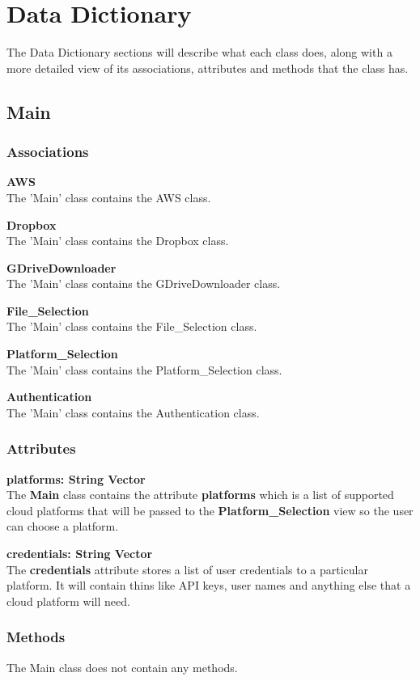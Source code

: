 \section{Data Dictionary}
The Data Dictionary sections will describe what each class does, along with a more detailed view of its
associations, attributes and methods that the class has.

\subsection{Main}

\subsubsection{Associations}
\textbf{AWS} \\
The 'Main' class contains the AWS class.

\textbf{Dropbox} \\
The 'Main' class contains the Dropbox class.

\textbf{GDriveDownloader} \\
The 'Main' class contains the GDriveDownloader class.

\textbf{File\_Selection} \\
The 'Main' class contains the File\_Selection class.

\textbf{Platform\_Selection} \\
The 'Main' class contains the Platform\_Selection class.

\textbf{Authentication} \\
The 'Main' class contains the Authentication class.

\subsubsection{Attributes}
\textbf{platforms: String Vector} \\
The \textbf{Main} class contains the attribute \textbf{platforms} which is a list of
supported cloud platforms that will be passed to the \textbf{Platform\_Selection} view
so the user can choose a platform.

\textbf{credentials: String Vector} \\
The \textbf{credentials} attribute stores a list of user credentials to a particular
platform. It will contain thins like API keys, user names and anything else that a
cloud platform will need.

\subsubsection{Methods}
The Main class does not contain any methods.

